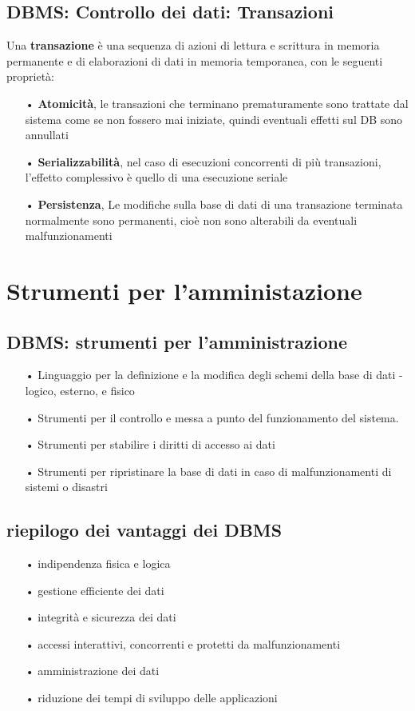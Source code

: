 \documentclass[12pt, letterpaper]{article}
\begin{document}
\subsection{DBMS: Controllo dei dati: Transazioni}

Una \textbf{transazione} è una sequenza di azioni di lettura e scrittura in
memoria permanente e di elaborazioni di dati in memoria temporanea, con le
seguenti proprietà:
\begin{itemize}
   \item[•] \textbf{Atomicità}, le transazioni che terminano prematuramente sono trattate dal sistema come se 
   non fossero mai iniziate, quindi eventuali effetti sul DB sono annullati
   \item[•] \textbf{Serializzabilità}, nel caso di esecuzioni concorrenti di più transazioni, l’effetto
complessivo è quello di una esecuzione seriale
   \item[•] \textbf{Persistenza}, Le modifiche sulla base di dati di una transazione terminata
normalmente sono permanenti, cioè non sono alterabili da eventuali
malfunzionamenti
\end{itemize}

\section{Strumenti per l'amministazione}
\subsection{DBMS: strumenti per l'amministrazione}

\begin{itemize}
   \item[•] Linguaggio per la definizione e la modifica degli schemi della base di dati
- logico, esterno, e fisico
\item[•] Strumenti per il controllo e messa a punto del funzionamento del sistema.
\item[•] Strumenti per stabilire i diritti di accesso ai dati 
\item[•] Strumenti per ripristinare la base di dati in caso di malfunzionamenti di sistemi o disastri 
\end{itemize}

\subsection{riepilogo dei vantaggi dei DBMS}

\begin{itemize}
   \item[•] indipendenza fisica e logica 
   \item[•] gestione efficiente dei dati 
   \item[•] integrità e sicurezza dei dati  
   \item[•] accessi interattivi, concorrenti e protetti da malfunzionamenti
   \item[•] amministrazione dei dati
   \item[•] riduzione dei tempi di sviluppo delle applicazioni 
\end{itemize}
\end{document}
